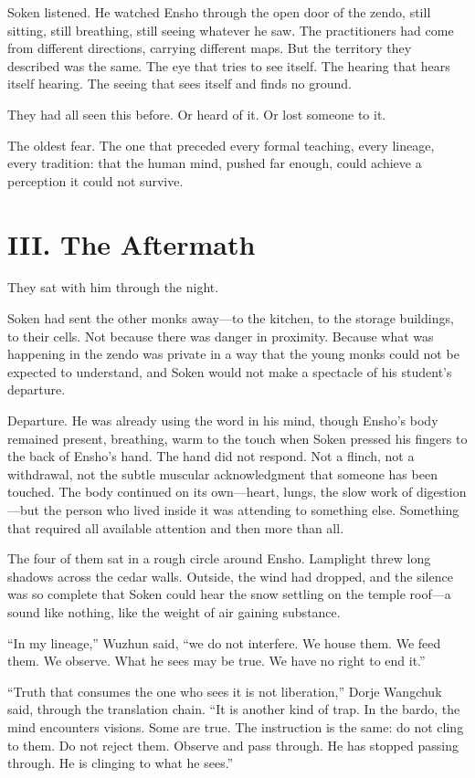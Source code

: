 Soken listened. He watched Ensho through the open door of the zendo, still sitting, still breathing, still seeing whatever he saw. The practitioners had come from different directions, carrying different maps. But the territory they described was the same. The eye that tries to see itself. The hearing that hears itself hearing. The seeing that sees itself and finds no ground.

They had all seen this before. Or heard of it. Or lost someone to it.

The oldest fear. The one that preceded every formal teaching, every lineage, every tradition: that the human mind, pushed far enough, could achieve a perception it could not survive.


\section*{III. The Aftermath}

They sat with him through the night.

Soken had sent the other monks away---to the kitchen, to the storage buildings, to their cells. Not because there was danger in proximity. Because what was happening in the zendo was private in a way that the young monks could not be expected to understand, and Soken would not make a spectacle of his student's departure.

Departure. He was already using the word in his mind, though Ensho's body remained present, breathing, warm to the touch when Soken pressed his fingers to the back of Ensho's hand. The hand did not respond. Not a flinch, not a withdrawal, not the subtle muscular acknowledgment that someone has been touched. The body continued on its own---heart, lungs, the slow work of digestion---but the person who lived inside it was attending to something else. Something that required all available attention and then more than all.

The four of them sat in a rough circle around Ensho. Lamplight threw long shadows across the cedar walls. Outside, the wind had dropped, and the silence was so complete that Soken could hear the snow settling on the temple roof---a sound like nothing, like the weight of air gaining substance.

``In my lineage,'' Wuzhun said, ``we do not interfere. We house them. We feed them. We observe. What he sees may be true. We have no right to end it.''

``Truth that consumes the one who sees it is not liberation,'' Dorje Wangchuk said, through the translation chain. ``It is another kind of trap. In the bardo, the mind encounters visions. Some are true. The instruction is the same: do not cling to them. Do not reject them. Observe and pass through. He has stopped passing through. He is clinging to what he sees.''

